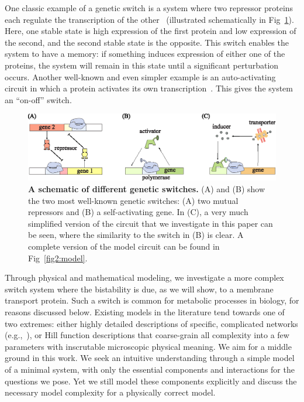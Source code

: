 \documentclass[10pt,letterpaper]{article}
\begin{document}
	One classic example of a genetic switch is a system where two repressor
	proteins each regulate the transcription of the
	other~\cite{Jacob1961,Gardner2000} (illustrated schematically in
	Fig~\ref{fig0:switches}). Here, one stable state is high expression of
	the first protein and low expression of the second,
	and the second stable state is the opposite. This
	switch enables the system to have a memory: if something induces expression
	of either one of the proteins, the system will remain in this state until a
	significant perturbation occurs. Another well-known and even simpler example
	is an auto-activating circuit in which a protein activates its own
	transcription~\cite{Wolf1998}. This gives the system an ``on-off'' switch.
	
	\begin{figure}%
		\centering
		\includegraphics{media/Fig0_switches.eps}
		\caption{{\bf A schematic of different genetic switches.}
			(A) and (B) show the two most well-known genetic switches:
			(A) two mutual repressors and (B) a self-activating gene.
			In (C), a very much simplified version of the
			circuit that we investigate in this paper can be seen, where the
			similarity to the switch in (B) is clear. A complete version of
			the model circuit can be found in Fig~\ref{fig2:model}.}
		\label{fig0:switches}
	\end{figure}
	
	Through physical and mathematical modeling, we investigate a more complex
	switch system where the bistability is due, as we will show, to a
	membrane transport protein. Such a switch is common for
	metabolic processes in biology, for reasons discussed below.
	Existing models in the literature tend towards one of two extremes:
	either highly detailed descriptions of specific, complicated networks (e.g.,~\cite{Wong1997}),
	or Hill function descriptions that coarse-grain all complexity
	into a few parameters with inscrutable microscopic physical meaning.
	We aim for a middle ground in this work.
	We seek an intuitive understanding through a simple model of a minimal system,
	with only the essential components and interactions for the questions we pose.
	Yet we still model these components explicitly and
	discuss the necessary model complexity for a physically correct model.
	
\end{document}
